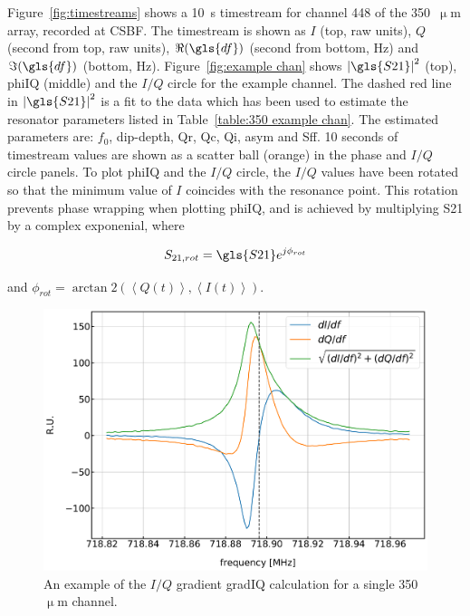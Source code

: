 Figure~\ref{fig:timestreams} shows a 10~s timestream for channel 448 of the 350~$\upmu$m array, recorded at CSBF. The timestream is shown as $I$ (top, raw units), $Q$ (second from top, raw units), $\Re(\gls{df})$ (second from bottom, Hz) and $\Im(\gls{df})$ (bottom, Hz). Figure~\ref{fig:example chan} shows $\left| \gls{S21} \right|^{2}$ (top), \gls{phiIQ} (middle) and the $I/Q$ circle for the example channel. The dashed red line in $\left| \gls{S21} \right|^{2}$ is a fit to the data which has been used to estimate the resonator parameters listed in Table~\ref{table:350 example chan}. The estimated parameters are: $f_{0}$, dip-depth, \gls{Qr}, \gls{Qc}, \gls{Qi}, \gls{asym} and \gls{Sff}. 10 seconds of timestream values are shown as a scatter ball (orange) in the phase and $I/Q$ circle panels. To plot \gls{phiIQ} and the $I/Q$ circle, the $I/Q$ values have been rotated so that the minimum value of $I$ coincides with the resonance point. This rotation prevents phase wrapping when plotting \gls{phiIQ}, and is achieved by multiplying \gls{S21} by a complex exponenial, where

\begin{equation}
  S_{21,rot} = \gls{S21} e^{j\phi_{rot}}
\end{equation}

and $\phi_{rot} = \arctan2(\left< Q(t) \right>, \left< I(t) \right>)$.

\begin{figure}[!htbp]
\centering
\includegraphics[width=\textwidth]{figures/blast_data/timestreams/350_pal_IQgradExample_448}
\caption[~ for a single 350~ channel.]{An example of the $I/Q$ gradient \gls{gradIQ} calculation for a single 350~$\upmu$m channel.}
\label{fig:IQ grad}
\end{figure}


